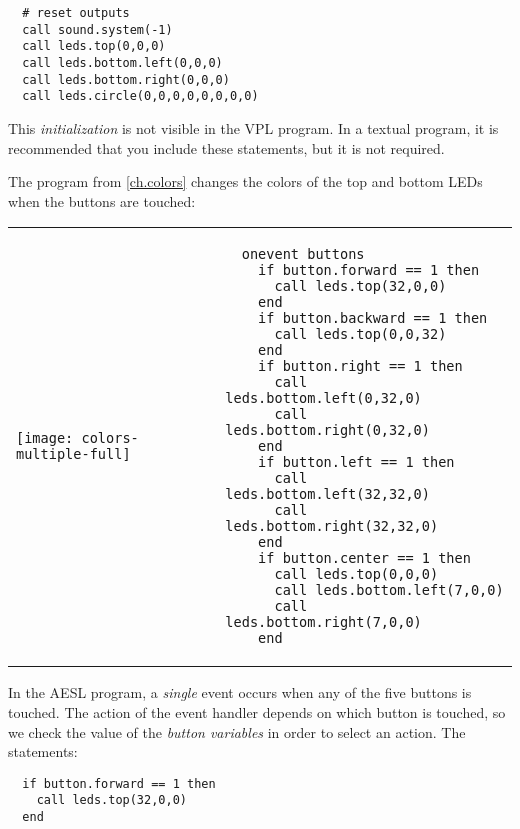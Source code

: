 \begin{footnotesize}
\begin{verbatim}
  # reset outputs
  call sound.system(-1)
  call leds.top(0,0,0)
  call leds.bottom.left(0,0,0)
  call leds.bottom.right(0,0,0)
  call leds.circle(0,0,0,0,0,0,0,0)
\end{verbatim}
\end{footnotesize}

This \emph{initialization} is not visible in the VPL program. In a
textual program, it is recommended that you include these statements,
but it is not required.



The program  from \cref{ch.colors} changes the
colors of the top and bottom LEDs when the buttons are touched:

\begin{center}
\begin{tabular}{ll}
\texttt{[image: colors-multiple-full]} &
\begin{minipage}[b]{.5\textwidth}
\begin{footnotesize}
\begin{verbatim}
  onevent buttons
    if button.forward == 1 then
      call leds.top(32,0,0)
    end
    if button.backward == 1 then
      call leds.top(0,0,32)
    end
    if button.right == 1 then
      call leds.bottom.left(0,32,0)
      call leds.bottom.right(0,32,0)
    end
    if button.left == 1 then
      call leds.bottom.left(32,32,0)
      call leds.bottom.right(32,32,0)
    end
    if button.center == 1 then
      call leds.top(0,0,0)
      call leds.bottom.left(7,0,0)
      call leds.bottom.right(7,0,0)
    end
\end{verbatim}
\end{footnotesize}
\vspace*{5ex}
\end{minipage}
\end{tabular}
\end{center}

In the AESL program, a \emph{single} event occurs when any of the five
buttons is touched. The action of the event handler 
depends on which button is touched, so we check the value of the
\emph{button variables} in order to select an action. The statements:

\begin{footnotesize}
\begin{verbatim}
  if button.forward == 1 then
    call leds.top(32,0,0)
  end
\end{verbatim}
\end{footnotesize}

